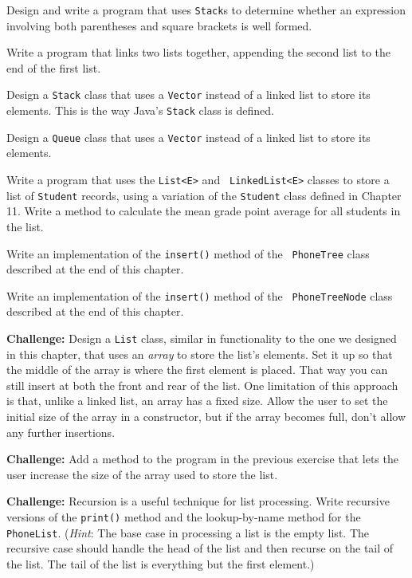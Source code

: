 \begin{EXRtwo}
\item  Design and write a program that uses {\tt Stack}s to determine
whether an expression involving both parentheses and square brackets
is well formed.

\item  Write a program that links two lists together, appending
the second list to the end of the first list.

\item  Design a {\tt Stack} class that uses
a {\tt Vector} instead of a linked list to store its elements.  This
is the way Java's {\tt Stack} class is defined.

\item  Design a {\tt Queue} class that uses
a {\tt Vector} instead of a linked list to store its elements.

\item Write a program that uses the {\tt List<E>} and {\tt
LinkedList<E>} classes to store a list of {\tt Student} records, using
a variation of the {\tt Student} class defined in Chapter 11. Write a
method to calculate the mean grade point average for all students in
the list.

\item Write an implementation of the {\tt insert()} method of the {\tt
PhoneTree} class described at the end of this chapter.

\item Write an implementation of the {\tt insert()} method of the {\tt
PhoneTreeNode} class described at the end of this chapter.

\item  {\bf Challenge:} Design a {\tt List} class, similar in
functionality to the one we designed in this chapter, that uses an
{\it array} to store the list's elements.  Set it up so that the middle
of the array is where the first element is placed.  That way you can still
insert at both the front and rear of the list.   One limitation of this
approach is that, unlike a linked list, an array has a fixed
size.  Allow the user to set the initial size of the array in a
constructor, but if the array becomes full, don't allow any further
insertions.

\item  {\bf Challenge:} Add a method to the program in the previous
exercise that lets the user increase the size of the array used to
store the list.

\item  {\bf Challenge:} Recursion is a useful technique for list processing.
Write recursive versions of the {\tt print()} method and the lookup-by-name
method for the {\tt PhoneList}. ({\it Hint}: The base case in processing
a list is the empty list.  The recursive case should handle the head of
the list and then recurse on the tail of the list.  The tail of the
list is everything but the first element.)



\end{EXRtwo}
